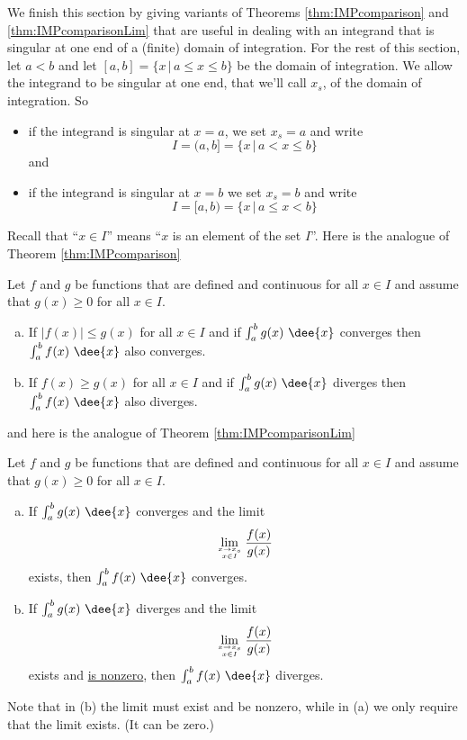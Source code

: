 We finish this section by giving variants of Theorems \ref{thm:IMPcomparison} 
and \ref{thm:IMPcomparisonLim} that are useful in dealing with an integrand 
that is singular at one end of a (finite) domain of integration. For
the rest of this section, let $a<b$ and let $[a,b]=\big\{x\,\big|\,a\le x\le b\big\}$ be the domain
of integration. We allow the integrand to be singular at one end, that we'll call $x_s$,
of the domain of integration. So
\begin{itemize}
\item if the integrand is singular at $x=a$, we set $x_s=a$ and write 
       \begin{equation*}
      I=(a,b]=\big\{x\,\big|\,a < x\le b\big\}
       \end{equation*}
      and
\item if the integrand is singular at $x=b$ we set $x_s=b$ and write 
       \begin{equation*}
      I=[a,b)=\big\{x\,\big|\,a \le x< b\big\}
      \end{equation*}
\end{itemize}
Recall that ``$x\in I$'' means ``$x$ is an element of the set $I$''. Here is the analogue
of Theorem \ref{thm:IMPcomparison} 
\begin{theorem}[Comparison]\label{thm:IMPcomparisonFinite}
Let $f$ and $g$ be functions that are defined and continuous for all $x\in I$ 
and assume that  $g(x)\ge 0$ for all  $x\in I$.
\begin{enumerate}[(a)]
\item If $|f(x)|\le g(x)$ for all $x\in I$ and if $\int_a^b g(x)\ \dee{x}$
  converges then $\int_a^b f(x)\ \dee{x}$ also converges.
\item If $f(x)\ge g(x)$ for all $x\in I$ and if $\int_a^b g(x)\ \dee{x}$
 diverges then $\int_a^b f(x)\ \dee{x}$ also diverges.
\end{enumerate}
\end{theorem}
and here is the analogue of Theorem \ref{thm:IMPcomparisonLim} 
\begin{theorem}\label{thm:IMPcomparisonLimFinite}
Let $f$ and $g$ be functions that are defined
and continuous for all $x\in I$ and assume that  $g(x)\ge 0$ for all
$x\in I$.
\begin{enumerate}[(a)]
\item If  $\int_a^b g(x)\ \dee{x}$ converges and the limit
\begin{align*}
\lim_{x\rightarrow x_s\atop x\in I}\frac{f(x)}{g(x)}
\end{align*}
exists, then $\int_a^b f(x)\ \dee{x}$ converges.
\item If $\int_a^b g(x)\ \dee{x}$  diverges and the limit
\begin{align*}
\lim_{x\rightarrow x_s\atop x\in I}\frac{f(x)}{g(x)}
\end{align*}
exists and \underline{is nonzero}, then $\int_a^b f(x)\ \dee{x}$ diverges.
\end{enumerate}
Note that in (b) the limit must exist and be nonzero, while in (a) we only
require that the limit exists. (It can be zero.)
\end{theorem}

